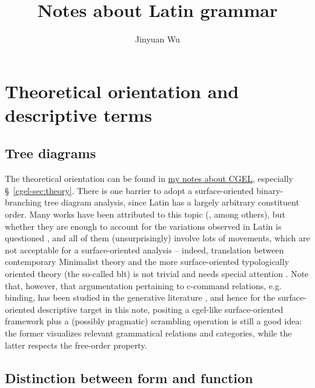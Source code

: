 \documentclass{article}
\title{Notes about Latin grammar}
\author{Jinyuan Wu}
\newcommand*{\citesec}[1]{\S~{#1}}
\newcommand{\cgel}{\href{../English/cambridge.pdf}{my notes about CGEL}}
\begin{document}
\maketitle

\automath

\section{Theoretical orientation and descriptive terms}

\subsection{Tree diagrams}

The theoretical orientation can be found in \cgel, especially \citesec{\ref{cgel-sec:theory}}.
There is one barrier to adopt a surface-oriented binary-branching tree diagram analysis,
since Latin has a largely arbitrary constituent order. 
Many works have been attributed to this topic 
(\citealt{danckaert2011left,devine2006latin}, among others),
but whether they are enough to account for the variations observed in Latin is questioned
\citep{spevak2007latin},
and all of them (unsurprisingly) involve lots of movements,
which are not acceptable for a surface-oriented analysis --
indeed, translation between contemporary Minimalist theory 
and the more surface-oriented typologically oriented theory (the so-called \ac{blt})
is not trivial and needs special attention \citep{clausetypology}.
Note that, however, that argumentation pertaining to c-command relations, e.g. binding,
has been studied in the generative literature \citep{mateu2017latin},
and hence for the surface-oriented descriptive target in this note,
positing a \acs{cgel}-like surface-oriented framework 
plus a (possibly pragmatic) scrambling operation is still a good idea:
the former visualizes relevant grammatical relations and categories,
while the latter respects the free-order property.

\subsection{Distinction between form and function}
\end{document}
